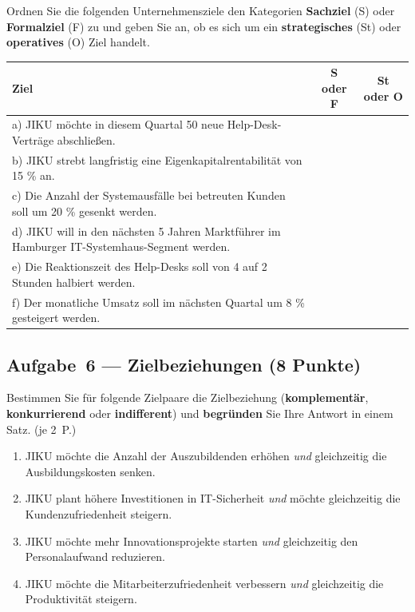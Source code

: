 \documentclass[11pt, a4paper]{article}
\begin{document}
Ordnen Sie die folgenden Unternehmensziele den Kategorien \textbf{Sachziel} (S) oder
\textbf{Formalziel} (F) zu und geben Sie an, ob es sich um ein \textbf{strategisches} (St)
oder \textbf{operatives} (O) Ziel handelt.

\bigskip

\noindent
\begin{tabular}{|p{9cm}|c|c|}
\hline
\textbf{Ziel} & \textbf{S oder F} & \textbf{St oder O}\\
\hline
a) JIKU möchte in diesem Quartal 50 neue Help-Desk-Verträge abschließen. & & \\[0.5cm]
\hline
b) JIKU strebt langfristig eine Eigenkapitalrentabilität von 15 \% an. & & \\[0.5cm]
\hline
c) Die Anzahl der Systemausfälle bei betreuten Kunden soll um 20 \% gesenkt werden. & & \\[0.5cm]
\hline
d) JIKU will in den nächsten 5 Jahren Marktführer im Hamburger IT-Systemhaus-Segment werden. & & \\[0.5cm]
\hline
e) Die Reaktionszeit des Help-Desks soll von 4 auf 2 Stunden halbiert werden. & & \\[0.5cm]
\hline
f) Der monatliche Umsatz soll im nächsten Quartal um 8 \% gesteigert werden. & & \\[0.5cm]
\hline
\end{tabular}

\bigskip

\subsection*{Aufgabe~6 --- Zielbeziehungen (8 Punkte)}

Bestimmen Sie für folgende Zielpaare die Zielbeziehung (\textbf{komplementär},
\textbf{konkurrierend} oder \textbf{indifferent}) und \textbf{begründen} Sie Ihre
Antwort in einem Satz. \hfill (je 2~P.)

\begin{enumerate}[label=(\alph*)]
  \item JIKU möchte die Anzahl der Auszubildenden erhöhen \emph{und} gleichzeitig die
  Ausbildungskosten senken.

  \vspace{2.5cm}

  \item JIKU plant höhere Investitionen in IT-Sicherheit \emph{und} möchte gleichzeitig
  die Kundenzufriedenheit steigern.

  \vspace{2.5cm}

  \item JIKU möchte mehr Innovationsprojekte starten \emph{und} gleichzeitig den
  Personalaufwand reduzieren.

  \vspace{2.5cm}

  \item JIKU möchte die Mitarbeiterzufriedenheit verbessern \emph{und} gleichzeitig
  die Produktivität steigern.

  \vspace{2.5cm}
\end{enumerate}
\end{document}
